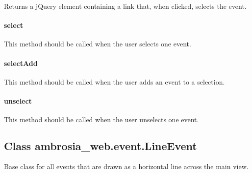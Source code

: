 \documentclass[letterpaper,10pt,english]{sphinxmanual}
\begin{document}
Returns a jQuery element containing a link that, when clicked, selects the event.


\paragraph{select}
\label{ambrosia_web.event.Event:select}

\begin{fulllineitems}
\label{ambrosia_web.event.Event:ambrosia_web.event.Event.select}
\end{fulllineitems}


This method should be called when the user selects one event.


\paragraph{selectAdd}
\label{ambrosia_web.event.Event:selectadd}

\begin{fulllineitems}
\label{ambrosia_web.event.Event:ambrosia_web.event.Event.selectAdd}
\end{fulllineitems}


This method should be called when the user adds an event to a selection.


\paragraph{unselect}
\label{ambrosia_web.event.Event:unselect}

\begin{fulllineitems}
\label{ambrosia_web.event.Event:ambrosia_web.event.Event.unselect}
\end{fulllineitems}


This method should be called when the user unselects one event.


\subsection{Class ambrosia\_web.event.LineEvent}
\label{ambrosia_web.event.LineEvent::doc}\label{ambrosia_web.event.LineEvent:class-ambrosia-web-event-lineevent}
Base class for all events that are drawn as a horizontal line across the main view.
\end{document}
